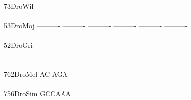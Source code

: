 \documentclass[11pt,twoside,reqno,a4paper]{article}
\begin{document}
{73\hspace*{3\charwidth}DroWil	----------	----------	----------	----------	----------	----------	\\
\hspace*{5\charwidth}\hspace*{7\charwidth}\hspace*{1\charwidth}\hspace*{1\charwidth}\hspace*{1\charwidth}\hspace*{1\charwidth}\hspace*{1\charwidth}\hspace*{1\charwidth}\\
53\hspace*{3\charwidth}DroMoj	----------	----------	----------	----------	----------	----------	\\
\hspace*{5\charwidth}\hspace*{7\charwidth}\hspace*{1\charwidth}\hspace*{1\charwidth}\hspace*{1\charwidth}\hspace*{1\charwidth}\hspace*{1\charwidth}\hspace*{1\charwidth}\\
52\hspace*{3\charwidth}DroGri	----------	----------	----------	----------	----------	----------	\\
\hspace*{5\charwidth}\hspace*{7\charwidth}\hspace*{1\charwidth}\hspace*{1\charwidth}\hspace*{1\charwidth}\hspace*{1\charwidth}\hspace*{1\charwidth}\hspace*{1\charwidth}\\
\\
762\hspace*{2\charwidth}DroMel	AC-AGA\\
\hspace*{5\charwidth}\hspace*{7\charwidth}\\
756\hspace*{2\charwidth}DroSim	GCCAAA\\
\hspace*{5\charwidth}\hspace*{7\charwidth}\\
}
\end{document}
